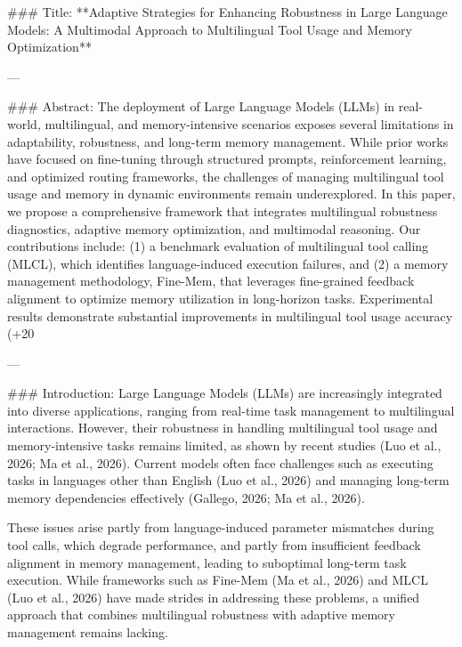 ### Title:
**Adaptive Strategies for Enhancing Robustness in Large Language Models: A Multimodal Approach to Multilingual Tool Usage and Memory Optimization**

---

### Abstract:
The deployment of Large Language Models (LLMs) in real-world, multilingual, and memory-intensive scenarios exposes several limitations in adaptability, robustness, and long-term memory management. While prior works have focused on fine-tuning through structured prompts, reinforcement learning, and optimized routing frameworks, the challenges of managing multilingual tool usage and memory in dynamic environments remain underexplored. In this paper, we propose a comprehensive framework that integrates multilingual robustness diagnostics, adaptive memory optimization, and multimodal reasoning. Our contributions include: (1) a benchmark evaluation of multilingual tool calling (MLCL), which identifies language-induced execution failures, and (2) a memory management methodology, Fine-Mem, that leverages fine-grained feedback alignment to optimize memory utilization in long-horizon tasks. Experimental results demonstrate substantial improvements in multilingual tool usage accuracy (+20%

---

### Introduction:
Large Language Models (LLMs) are increasingly integrated into diverse applications, ranging from real-time task management to multilingual interactions. However, their robustness in handling multilingual tool usage and memory-intensive tasks remains limited, as shown by recent studies (Luo et al., 2026; Ma et al., 2026). Current models often face challenges such as executing tasks in languages other than English (Luo et al., 2026) and managing long-term memory dependencies effectively (Gallego, 2026; Ma et al., 2026).

These issues arise partly from language-induced parameter mismatches during tool calls, which degrade performance, and partly from insufficient feedback alignment in memory management, leading to suboptimal long-term task execution. While frameworks such as Fine-Mem (Ma et al., 2026) and MLCL (Luo et al., 2026) have made strides in addressing these problems, a unified approach that combines multilingual robustness with adaptive memory management remains lacking.

